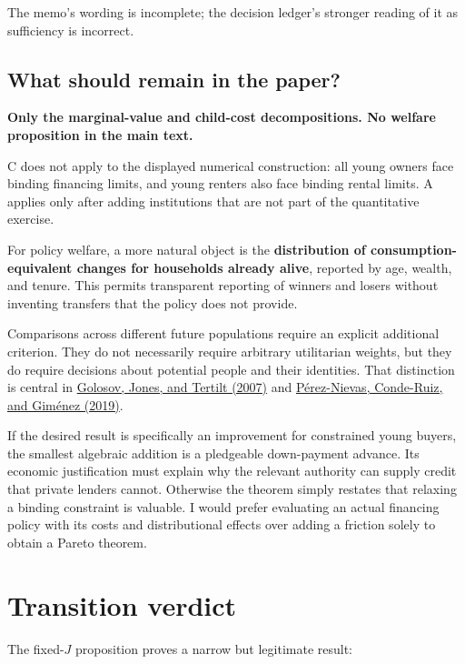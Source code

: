 \documentclass[11pt,letterpaper]{article}
\begin{document}
The memo's wording is incomplete; the decision ledger's stronger reading of it as
sufficiency is incorrect.

\subsection{What should remain in the paper?}\label{what-should-remain-in-the-paper}

\textbf{Only the marginal-value and child-cost decompositions. No welfare proposition in
the main text.}

C does not apply to the displayed numerical construction: all young owners face binding
financing limits, and young renters also face binding rental limits. A applies only after
adding institutions that are not part of the quantitative exercise.

For policy welfare, a more natural object is the \textbf{distribution of
consumption-equivalent changes for households already alive}, reported by age, wealth, and
tenure. This permits transparent reporting of winners and losers without inventing
transfers that the policy does not provide.

Comparisons across different future populations require an explicit additional criterion.
They do not necessarily require arbitrary utilitarian weights, but they do require
decisions about potential people and their identities. That distinction is central in
\href{https://onlinelibrary.wiley.com/doi/abs/10.1111/j.1468-0262.2007.00781.x}{Golosov,
Jones, and Tertilt (2007)} and
\href{https://onlinelibrary.wiley.com/doi/full/10.3982/TE2138}{Pérez-Nievas, Conde-Ruiz,
and Giménez (2019)}.

If the desired result is specifically an improvement for constrained young buyers, the
smallest algebraic addition is a pledgeable down-payment advance. Its economic
justification must explain why the relevant authority can supply credit that private
lenders cannot. Otherwise the theorem simply restates that relaxing a binding constraint
is valuable. I would prefer evaluating an actual financing policy with its costs and
distributional effects over adding a friction solely to obtain a Pareto theorem.

\section{Transition verdict}\label{transition-verdict}

The fixed-\(J\) proposition proves a narrow but legitimate result:
\end{document}
